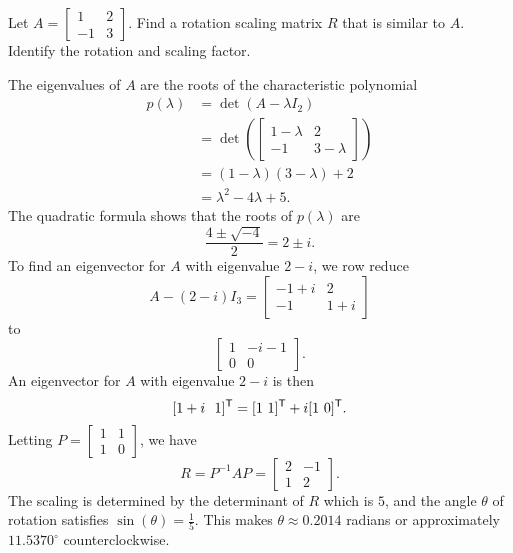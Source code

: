 \begin{example} Let $A = \left[ \begin{array}{rc} 1&2\\-1&3 \end{array} \right]$.  Find a rotation scaling matrix $R$ that is similar to $A$. Identify the rotation and scaling factor.


\ExampleSolution
The eigenvalues of $A$ are the roots of the characteristic polynomial
\begin{align*}
p(\lambda) &= \det(A - \lambda I_2) \\
	&= \det\left(\left[ \begin{array}{rc} 1-\lambda&2\\-1&3-\lambda \end{array} \right]\right) \\
	&= (1-\lambda)(3-\lambda) + 2 \\
	&= \lambda^2 -4\lambda + 5.
\end{align*}
The quadratic formula shows that the roots of $p(\lambda)$ are 
\[\frac{4 \pm \sqrt{-4}}{2} = 2 \pm i.\]
To find an eigenvector for $A$ with eigenvalue $2-i$, we row reduce 
\[A - (2-i) I_3 =   \left[ \begin{array}{cc} -1+i&2\\-1&1+i \end{array} \right]\]
to 
\[\left[ \begin{array}{cc} 1&-i-1\\0&0 \end{array} \right].\]
An eigenvector for $A$ with eigenvalue $2-i$ is then 
\[[ 1+i \  \ 1]^{\mathsf{T}} = [1 \ 1]^{\mathsf{T}} + i[1 \ 0]^{\mathsf{T}}.\]
Letting $P = \left[  \begin{array}{cc} 1&1\\1&0 \end{array} \right]$, we have 
\[R = P^{-1}AP = \left[ \begin{array}{cr} 2&-1\\1&2 \end{array} \right].\]
The scaling is determined by the determinant of $R$ which is $5$, and the angle $\theta$ of rotation satisfies $\sin(\theta) = \frac{1}{5}$. This makes  $\theta \approx 0.2014$ radians or approximately $11.5370^{\circ}$ counterclockwise. 


\end{example}




